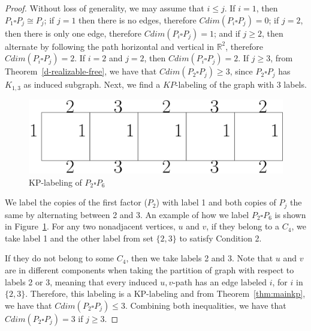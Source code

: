 \documentclass[12pt,a4paper,titlepage,openany]{report}
\begin{document}
\begin{proof}

 Without loss of generality, we may assume that $i\leq j$.\newline
 If $i=1$, then $P_1\square P_j\cong P_j$; if $j=1$ then there is no edges, therefore $Cdim(P_i\square P_j)=0$; if $j=2$, then there is only one edge, therefore $Cdim(P_i\square P_j)=1$; and if $j\geq 2$, then alternate by following the path horizontal and vertical in $\mathbb{R}^2$, therefore $Cdim(P_i\square P_j)=2$.\newline 
If $i=2$ and $j=2$, then $Cdim(P_i\square P_j)=2$.
\newline
If $j\geq 3$, from Theorem~\ref{d-realizable-free}, we have that $Cdim(P_2\square P_j)\geq 3$, since $P_2 \square P_j$ has $K_{1,3}$ as induced subgraph.\newline
Next, we find a $KP$-labeling of the graph with 3 labels.
\begin{figure}[h]
\begin{center}
\includegraphics[width=1\linewidth]{figures/p_2sqp_j.png}
\end{center}
\caption{KP-labeling of $P_2\square P_6$}\label{fig:P_2sqP_6}
\end{figure}\newline
We label the copies of the first factor ($P_2$) with label 1 and both copies of $P_j$ the same by alternating between 2 and 3.
An example of how we label $P_2\square P_6$ is shown in Figure~\ref{fig:P_2sqP_6}.\newline
For any two nonadjacent vertices, $u$ and $v$, if they belong to a $C_4$, we take label 1 and the other label from set $\{2,3\}$ to satisfy Condition 2. 

If they do not belong to some $C_4$, then we take labels 2 and 3. Note that $u$ and $v$ are in different components when taking the partition of graph with respect to labels 2 or 3, meaning that every induced $u,v$-path has an edge labeled $i$, for $i$ in $\{2,3\}$.\newline
Therefore, this labeling is a KP-labeling and from Theorem~\ref{thm:mainkp}, we have that $Cdim(P_2\square P_j)\leq 3$.\newline
Combining both inequalities, we have that $Cdim(P_2\square P_j)=3$ if $j\geq 3$.


\end{proof}
\end{document}
